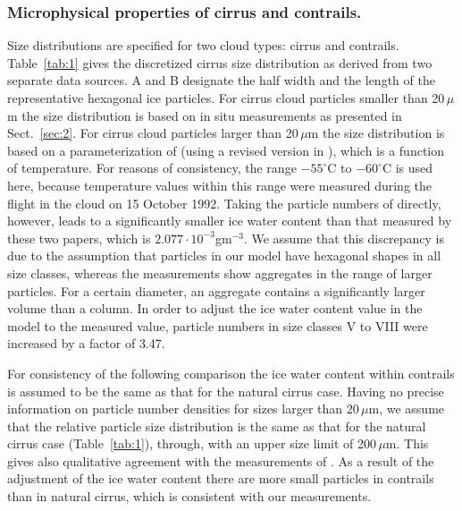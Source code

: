 \documentclass[agp]{svjour}
\begin{document}
\subsubsection{Microphysical properties of cirrus and contrails.}
%
Size distributions are specified for two cloud types: cirrus and
contrails. Table~\ref{tab:1} gives the discretized cirrus size distribution
as derived from two separate data sources. A and B designate the half
width and the length of the representative hexagonal ice particles. For
cirrus cloud particles smaller than 20\,$\mu$m the size distribution is
based on in situ measurements as presented in Sect.~\ref{sec:2}. For cirrus
cloud particles larger than 20\,$\mu$m the size distribution is based on a
parameterization of \citet{He84} (using a revised version in
\citet{Li92}), which is a function of temperature. For reasons of
consistency, the range $-55^{\circ}$C to $-60^{\circ}$C is used here,
because temperature values within this range were measured during the
flight in the cloud on 15 October 1992. Taking the particle numbers of
\citet{He84,Li92} directly, however, leads to a significantly smaller
ice water content than that measured by these two papers, which is
$2.077 \cdot 10^{-3}$gm$^{-3}$. We assume that this discrepancy is due
to the assumption that particles in our model have hexagonal shapes in
all size classes, whereas the measurements show aggregates in the range
of larger particles. For a certain diameter, an aggregate contains a
significantly larger volume than a column. In order to adjust the ice
water content value in the model to the measured value, particle numbers
in size classes V to VIII were increased by a factor of 3.47.

For consistency of the following comparison the ice water content within
contrails is assumed to be the same as that for the natural cirrus case.
Having no precise information on particle number densities for sizes
larger than 20\,$\mu$m, we assume that the relative particle size
distribution is the same as that for the natural cirrus case
(Table~\ref{tab:1}), through, with an upper size limit of 200\,$\mu$m. This
gives also qualitative agreement with the measurements of \citet{Ga96}.
As a result of the adjustment of the ice water content there are more
small particles in contrails than in natural cirrus, which is consistent
with our measurements.
\end{document}
